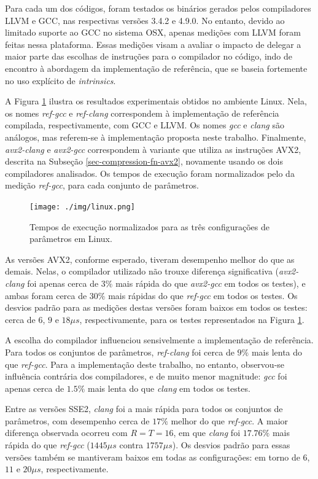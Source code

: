 \documentclass{article}
\begin{document}
Para cada um dos códigos, foram testados os binários gerados pelos
compiladores LLVM e GCC, nas respectivas versões 3.4.2 e 4.9.0. No
entanto, devido ao limitado suporte ao GCC no sistema OSX, apenas
medições com LLVM foram feitas nessa plataforma. Essas medições visam a
avaliar o impacto de delegar a maior parte das escolhas de instruções
para o compilador no código, indo de encontro à abordagem da
implementação de referência, que se baseia fortemente no uso explícito
de \emph{intrinsics}.

A Figura \ref{results-linux} ilustra os resultados experimentais obtidos
no ambiente Linux. Nela, os nomes \emph{ref-gcc} e \emph{ref-clang}
correspondem à implementação de referência compilada, respectivamente,
com GCC e LLVM. Os nomes \emph{gcc} e \emph{clang} são análogos, mas
referem-se à implementação proposta neste trabalho. Finalmente,
\emph{avx2-clang} e \emph{avx2-gcc} correspondem à variante que utiliza
as instruções AVX2, descrita na Subseção \ref{sec-compression-fn-avx2},
novamente usando os dois compiladores analisados. Os tempos de execução
foram normalizados pelo da medição \emph{ref-gcc}, para cada conjunto de
parâmetros.

\begin{figure}[htbp]
\centering
\texttt{[image: ./img/linux.png]}
\caption{Tempos de execução normalizados para as três configurações de parâmetros em Linux\label{results-linux}.}
\end{figure}

As versões AVX2, conforme esperado, tiveram desempenho melhor do que as
demais. Nelas, o compilador utilizado não trouxe diferença significativa
(\emph{avx2-clang} foi apenas cerca de $3\%$ mais rápida do que
\emph{avx2-gcc} em todos os testes), e ambas foram cerca de $30\%$
mais rápidas do que \emph{ref-gcc} em todos os testes. Os desvios padrão
para as medições destas versões foram baixos em todos os testes: cerca de $6$,
$9$ e $18 \mu s$, respectivamente, para os testes representados na Figura
\ref{results-linux}.

A escolha do compilador influenciou sensivelmente a implementação de
referência. Para todos os conjuntos de parâmetros, \emph{ref-clang} foi cerca
de $9\%$ mais lenta do que \emph{ref-gcc}. Para a implementação deste trabalho,
no entanto, observou-se influência contrária dos compiladores, e de muito menor
magnitude: \emph{gcc} foi apenas cerca de $1.5\%$ mais lenta do que \emph{clang}
em todos os testes.

Entre as versões SSE2, \emph{clang} foi a mais rápida para todos os conjuntos
de parâmetros, com desempenho cerca de $17\%$ melhor do que \emph{ref-gcc}. A
maior diferença observada ocorreu com $R = T = 16$, em que \emph{clang} foi
$17.76\%$ mais rápida do que \emph{ref-gcc} ($1445 \mu s$ contra $1757 \mu s$).
Os desvios padrão para essas versões também se mantiveram baixos em todas as
configurações: em torno de $6$, $11$ e $20 \mu s$, respectivamente.
\end{document}
